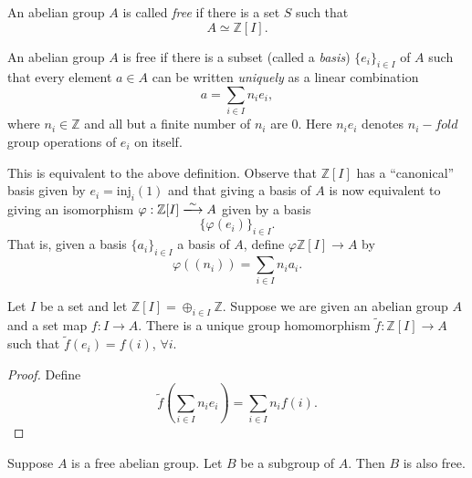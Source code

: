 \begin{defn}
An abelian group $A$ is called \emph{free} if there is a set $S$ such
that
$$
A \simeq \mathbb{Z}[I].
$$
\end{defn}

\begin{defn}[(Equivalent)]
An abelian group $A$ is free if there is a subset (called a \emph{basis})
$\{ e_i \}_{i \in I}$ of $A$ such that every element $a \in A$ can be
written \emph{uniquely} as a linear combination
$$
a = \sum_{i \in I} n_i e_i,
$$
where $n_i \in \mathbb{Z}$ and all but a finite number of $n_i$ are 0.
Here $n_i e_i$ denotes $n_i-fold$ group
operations of $e_i$ on itself.

This is equivalent to the above definition. Observe that
$\mathbb{Z}[I]$ has a ``canonical'' basis given by
$e_i = \mathrm{inj}_i(1)$ and that giving a basis of $A$ is now
equivalent to giving an isomorphism
$\varphi : \mathbb{Z}[I] \xlongrightarrow{\sim} A$ given by a basis
$$
\{\varphi(e_i)\}_{i \in I}.
$$
That is, given a basis $\{ a_i \}_{i \in I}$ a basis of $A$, define
$\varphi \mathbb{Z}[I] \to A$ by
$$
\varphi((n_i)) = \sum_{i \in I} n_i a_i.
$$
\end{defn}

\begin{prop}
Let $I$ be a set and let
$\mathbb{Z}[I] = \oplus_{i \in I} \mathbb{Z}$.
Suppose we are given an abelian group $A$ and a set map
$f : I \to A$. There is a unique group homomorphism
$\tilde{f} : \mathbb{Z}[I] \to A$ such that
$\tilde{f}(e_i) = f(i)$, $\forall i$.
\end{prop}

\begin{proof}
Define
$$
\tilde{f}\left(\sum_{i \in I} n_i e_i\right)
= \sum_{i \in I} n_i f(i).
$$
\end{proof}

\begin{theorem}
Suppose $A$ is a free abelian group. Let $B$ be a subgroup of $A$.
Then $B$ is also free.
\end{theorem}

